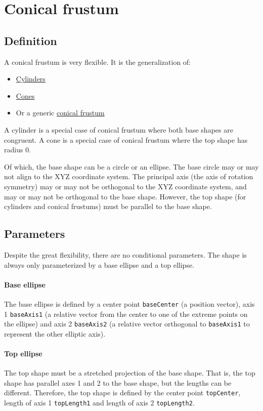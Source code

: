 \documentclass{report}
\begin{document}
			\section{Conical frustum}
				\subsection{Definition} A conical frustum is very flexible. It is the generalization of:
					\begin{itemize}
						\item \href{http://mathworld.wolfram.com/Cylinder.html}{Cylinders}
						\item \href{http://mathworld.wolfram.com/Cone.html}{Cones}
						\item Or a generic \href{http://mathworld.wolfram.com/ConicalFrustum.html}{conical frustum}
					\end{itemize}

					A cylinder is a special case of conical frustum where both base shapes are congruent. A cone is a
					special case of conical frustum where the top shape has radius 0.

					Of which, the base shape can be a circle or an ellipse. The base circle may or may not align to the
					XYZ coordinate system. The principal axis (the axis of rotation symmetry) may or may not be
					orthogonal to the XYZ coordinate system, and may or may not be orthogonal to the base shape.
					However, the top shape (for cylinders and conical frustums) must be parallel to the base shape.
				\subsection{Parameters} Despite the great flexibility, there are no conditional parameters. The shape
				is always only parameterized by a base ellipse and a top ellipse.
					\paragraph{Base ellipse} The base ellipse is defined by a center point \texttt{baseCenter} (a
					position vector), axis 1 \texttt{baseAxis1} (a relative vector from the center to one of the
					extreme points on the ellipse) and axis 2 \texttt{baseAxis2} (a relative vector orthogonal to
					\texttt{baseAxis1} to represent the other elliptic axis).
					\paragraph{Top ellipse} The top shape must be a stretched projection of the base shape. That is,
					the top shape has parallel axes 1 and 2 to the base shape, but the lengths can be different.
					Therefore, the top shape is defined by the center point \texttt{topCenter}, length of axis 1
					\texttt{topLength1} and length of axis 2 \texttt{topLength2}.
\end{document}
